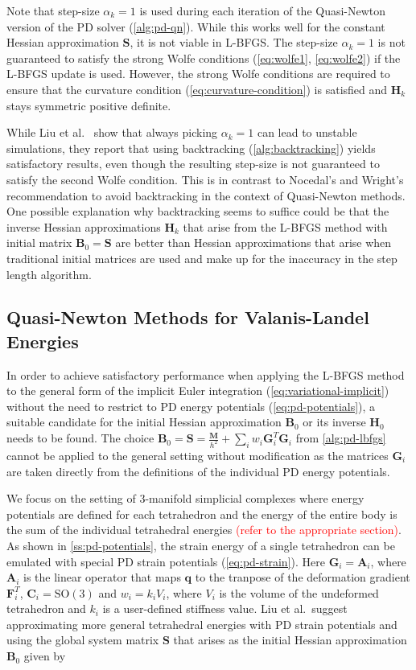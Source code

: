 Note that step-size $\alpha_k = 1$ is 
used during each iteration of the Quasi-Newton version of the PD solver (\cref{alg:pd-qn}).
While this works well for the constant Hessian approximation $\bm{S}$, it is not viable in L-BFGS. The step-size $\alpha_k = 1$
is not guaranteed to satisfy the strong Wolfe conditions (\cref{eq:wolfe1}, \cref{eq:wolfe2}) if the L-BFGS update is used. However,
the strong Wolfe conditions are required to ensure that the curvature condition (\cref{eq:curvature-condition}) is satisfied 
and $\bm{H}_k$ stays symmetric positive definite. 

While Liu et al.\ \cite{liu2017} show that always picking $\alpha_k = 1$ can lead to
unstable simulations, they report that using backtracking (\cref{alg:backtracking}) yields satisfactory results, even though 
the resulting step-size is not guaranteed to satisfy the second Wolfe condition. This is in contrast to Nocedal's and Wright's
recommendation \cite{nocedal2006} to avoid backtracking in the context of  Quasi-Newton methods. One possible explanation why 
backtracking seems to suffice could be that the inverse 
Hessian approximations $\bm{H}_k$ that arise from the L-BFGS method with initial matrix $\bm{B}_0 = \bm{S}$ are better than
Hessian approximations that arise when traditional initial matrices are used and make up for the inaccuracy in the step length
algorithm.

\subsection{Quasi-Newton Methods for Valanis-Landel Energies}\label{ss:qn-valanis-landel}
In order to achieve satisfactory performance when applying the L-BFGS method to the general form of the implicit Euler integration 
(\cref{eq:variational-implicit}) without the need to restrict to PD energy potentials (\cref{eq:pd-potentials}), a suitable
candidate for the initial Hessian approximation $\bm{B}_0$ or its inverse $\bm{H}_0$ needs to be found. The choice $\bm{B}_0 = 
\bm{S} = \frac{\bm{M}}{h^2} + \sum_i w_i \bm{G}_i^T \bm{G}_i$ from \cref{alg:pd-lbfgs} cannot be applied to the general setting 
without modification as the matrices $\bm{G}_i$ are taken directly from the definitions of the individual PD energy potentials.

We focus on the setting of 3-manifold simplicial complexes where energy potentials are defined for each tetrahedron and the
energy of the entire body is the sum of the individual tetrahedral energies \textcolor{red}{(refer to the appropriate section)}.
As shown in \cref{ss:pd-potentials}, the strain energy of a single tetrahedron can be emulated with special PD strain 
potentials (\cref{eq:pd-strain}). Here $\bm{G}_i = \bm{A}_i$, where $\bm{A}_i$ is the linear operator that maps $\bm{q}$ 
to the tranpose of the deformation gradient $\bm{F}^T_i$, $\bm{C}_i = \text{SO}(3)$ and $w_i = k_iV_i$, where $V_i$ is the
volume of the undeformed tetrahedron and $k_i$ is a user-defined stiffness value. 
Liu et al.\ suggest approximating more general tetrahedral energies with PD strain potentials and using the global system
matrix $\bm{S}$ that arises as the initial Hessian approximation $\bm{B}_0$ given by

